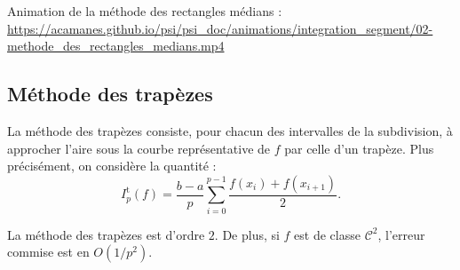 Animation de la méthode des rectangles médians : \url{https://acamanes.github.io/psi/psi_doc/animations/integration_segment/02-methode_des_rectangles_medians.mp4}

\subsection{Méthode des trapèzes}

La méthode des trapèzes consiste, pour chacun des intervalles de la subdivision, à approcher l'aire sous la courbe représentative de $f$ par celle d'un trapèze. Plus précisément, on considère la quantité :
\[
I_p^\mathrm{t}(f) =  \frac{b-a}{p} \sum_{i=0}^{p-1} \frac{f(x_i) + f(x_{i+1})}{2}.
\]

\begin{marginfigure}[0cm]
    \centering
    
\end{marginfigure}

\begin{prop}{}{}
La méthode des trapèzes est d'ordre $2$. De plus, si $f$ est de classe $\mathscr{C}^2$, l'erreur commise est en $O(1/p^2)$.
\end{prop}

